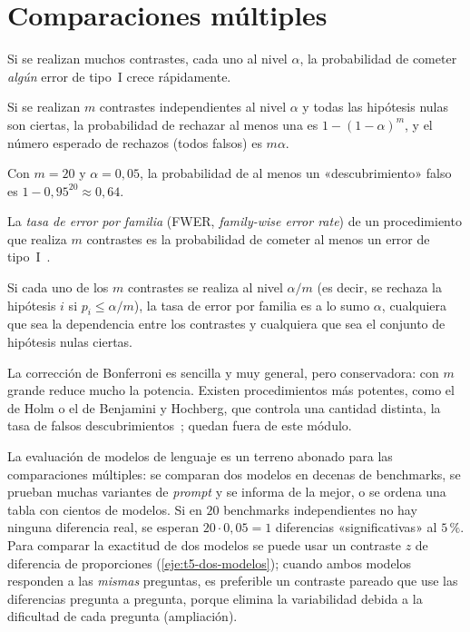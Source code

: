 \addtocounter{definicion}{1}%

\section{Comparaciones múltiples}

Si se realizan muchos contrastes, cada uno al nivel $\alpha$, la probabilidad de cometer \emph{algún} error de tipo~I crece rápidamente.

\begin{proposicion}\label{prop:t5-multiples}
Si se realizan $m$ contrastes independientes al nivel $\alpha$ y todas las hipótesis nulas son ciertas, la probabilidad de rechazar al menos una es $1-(1-\alpha)^{m}$, y el número esperado de rechazos (todos falsos) es $m\alpha$.
\end{proposicion}

Con $m=20$ y $\alpha=0{,}05$, la probabilidad de al menos un «descubrimiento» falso es $1-0{,}95^{20}\approx0{,}64$.

\begin{definicion}\label{def:t5-fwer}
La \emph{tasa de error por familia} (FWER, \emph{family-wise error rate}) de un procedimiento que realiza $m$ contrastes es la probabilidad de cometer al menos un error de tipo~I~\cite[clase~11]{stats200}.
\end{definicion}

\begin{teorema}\label{teo:t5-bonferroni}
Si cada uno de los $m$ contrastes se realiza al nivel $\alpha/m$ (es decir, se rechaza la hipótesis $i$ si $p_i\le\alpha/m$), la tasa de error por familia es a lo sumo $\alpha$, cualquiera que sea la dependencia entre los contrastes y cualquiera que sea el conjunto de hipótesis nulas ciertas.
\end{teorema}

La corrección de Bonferroni es sencilla y muy general, pero conservadora: con $m$ grande reduce mucho la potencia. Existen procedimientos más potentes, como el de Holm o el de Benjamini y Hochberg, que controla una cantidad distinta, la tasa de falsos descubrimientos~\cite[clase~11]{stats200}; quedan fuera de este módulo.

\begin{observacion}\label{obs:t5-benchmarks}
La evaluación de modelos de lenguaje es un terreno abonado para las comparaciones múltiples: se comparan dos modelos en decenas de benchmarks, se prueban muchas variantes de \emph{prompt} y se informa de la mejor, o se ordena una tabla con cientos de modelos. Si en $20$ benchmarks independientes no hay ninguna diferencia real, se esperan $20\cdot0{,}05=1$ diferencias «significativas» al $5\,\%$. Para comparar la exactitud de dos modelos se puede usar un contraste $z$ de diferencia de proporciones (\cref{eje:t5-dos-modelos}); cuando ambos modelos responden a las \emph{mismas} preguntas, es preferible un contraste pareado que use las diferencias pregunta a pregunta, porque elimina la variabilidad debida a la dificultad de cada pregunta (ampliación).
\end{observacion}

\addtocounter{definicion}{1}%

\addtocounter{definicion}{1}%

